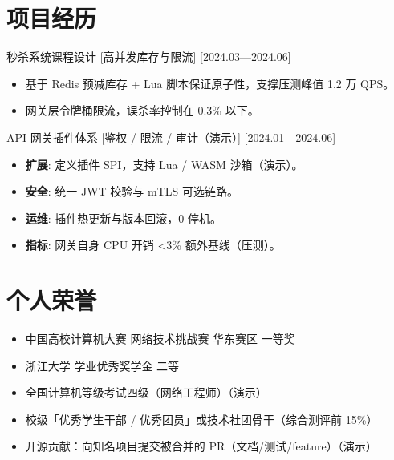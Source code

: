 \documentclass{resume-photo}
\begin{document}
\section{项目经历}
\ResumeItem
{秒杀系统课程设计}
[\textnormal{高并发库存与限流}]
[2024.03—2024.06]

\begin{itemize}
  \item 基于 Redis 预减库存 + Lua 脚本保证原子性，支撑压测峰值 1.2 万 QPS。
  \item 网关层令牌桶限流，误杀率控制在 0.3\% 以下。
\end{itemize}


\ResumeItem
{API 网关插件体系}
[\textnormal{鉴权 / 限流 / 审计（演示）}]
[2024.01—2024.06]

\begin{itemize}
  \item \textbf{扩展}: 定义插件 SPI，支持 Lua / WASM 沙箱（演示）。
  \item \textbf{安全}: 统一 JWT 校验与 mTLS 可选链路。
  \item \textbf{运维}: 插件热更新与版本回滚，0 停机。
  \item \textbf{指标}: 网关自身 CPU 开销 <3\% 额外基线（压测）。
\end{itemize}



\section{个人荣誉}
\begin{itemize}
  \item 中国高校计算机大赛 网络技术挑战赛 华东赛区 一等奖
  \item 浙江大学 学业优秀奖学金 二等
  \item 全国计算机等级考试四级（网络工程师）（演示）
  \item 校级「优秀学生干部 / 优秀团员」或技术社团骨干（综合测评前 15\%）
  \item 开源贡献：向知名项目提交被合并的 PR（文档/测试/feature）（演示）
\end{itemize}
\end{document}
